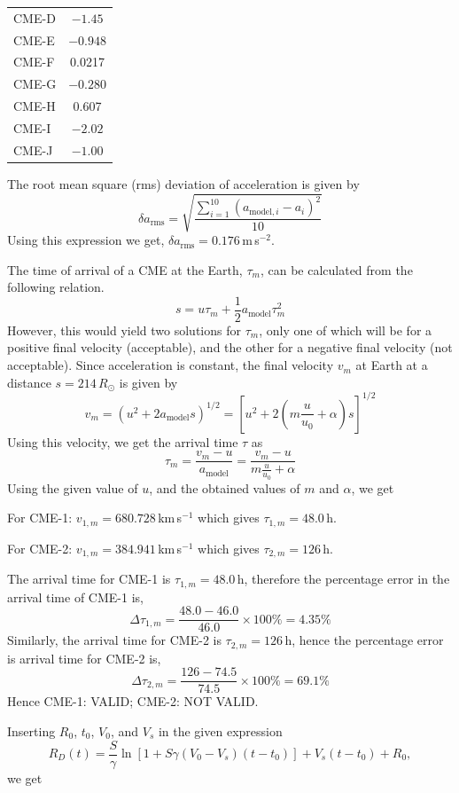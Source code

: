 \begin{description}
\begin{center}
\begin{tabular}{l c}
  CME-D & $-1.45$\\
  CME-E & $-0.948$\\
  CME-F & 0.0217\\
  CME-G & $-0.280$\\
  CME-H & 0.607\\
  CME-I & $-2.02$\\
  CME-J & $-1.00$\\
  \bottomrule
  \end{tabular}
  \end{center}
  The root mean square (rms) deviation of acceleration is given by
  \[
  \delta a_{\mathrm{rms}}
    = \sqrt{\frac{\sum_{i=1}^{10}(a_{\mathrm{model},i}-a_i)^2}{10}}
  \]
  Using this expression we get, $\delta a_{\mathrm{rms}} = 0.176$\,m\,s$^{-2}$.
\item[(D02.2a)] The time of arrival of a CME at the Earth, $\tau_m$, can be
  calculated from the following relation.
  \[
  s = u\tau_m + \frac{1}{2}a_{\mathrm{model}}\tau_m^2
  \]
  However, this would yield two solutions for $\tau_m$, only one of which will
  be for a positive final velocity (acceptable), and the other for a negative
  final velocity (not acceptable). Since acceleration is constant, the final
  velocity $v_m$ at Earth at a distance $s = 214\,R_\odot$ is given by
  \[
  v_m = \left(u^2 + 2a_{\mathrm{model}}s\right)^{1/2}
      = \left[u^2 + 2\left(m\frac{u}{u_0}+\alpha\right)s\right]^{1/2}
  \]
  Using this velocity, we get the arrival time $\tau$ as
  \[
  \tau_m = \frac{v_m - u}{a_{\mathrm{model}}}
         = \frac{v_m - u}{m\frac{u}{u_0}+\alpha}
  \]
  Using the given value of $u$, and the obtained values of $m$ and $\alpha$,
  we get

  For CME-1: $v_{1,m} = 680.728$\,km\,s$^{-1}$ which gives
  $\tau_{1,m} = 48.0$\,h.

  For CME-2: $v_{1,m} = 384.941$\,km\,s$^{-1}$ which gives
  $\tau_{2,m} = 126$\,h.
\item[(D02.2b)] The arrival time for CME-1 is $\tau_{1,m} = 48.0$\,h,
  therefore the percentage error in the arrival time of CME-1 is,
  \[
  \Delta\tau_{1,m} = \frac{48.0-46.0}{46.0}\times 100\% = 4.35\%
  \]
  Similarly, the arrival time for CME-2 is $\tau_{2,m} = 126$\,h, hence the
  percentage error is arrival time for CME-2 is,
  \[
  \Delta\tau_{2,m} = \frac{126-74.5}{74.5}\times 100\% = 69.1\%
  \]
  Hence CME-1: VALID; CME-2: NOT VALID.
\item[(D02.3a)] Inserting $R_0$, $t_0$, $V_0$, and $V_s$ in the given
  expression
  \[
  R_D(t) = \frac{S}{\gamma}\ln\left[1 + S\gamma(V_0-V_s)(t-t_0)\right]
         + V_s(t-t_0) + R_0,
  \]
  we get


\end{description}

